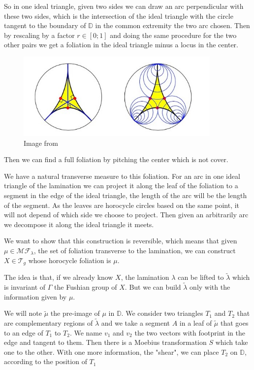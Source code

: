 So in one ideal triangle, given two sides we can draw an arc perpendicular with these two sides, which is the intersection of the ideal triangle with the circle tangent to the boundary of $\mathbb{D}$ in the common extremity the two arc chosen. Then by rescaling by a factor $r \in [0;1]$ and doing the same procedure for the two other pairs we get a foliation in the ideal triangle minus a locus in the center.


\begin{figure}[h!]
\centering
\includegraphics[width=10cm]{Image/FoliationTri.jpg}
\caption{Image from \cite{Martelli2016AnIT}}
\end{figure}

Then we can find a full foliation by pitching the center which is not cover.

We have a natural transverse measure to this foliation. For an arc in one ideal triangle of the lamination we can project it along the leaf of the foliation to a segment in the edge of the ideal triangle, the length of the arc will be the length of the segment. As the leaves are horocycle circles based on the same point, it will not depend of which side we choose to project. Then given an arbitrarily arc we decompose it along the ideal triangle it meets.

We want to show that this construction is reversible, which means that given $\mu \in \mathcal{MF}_\lambda $, the set of foliation transverse to the lamination, we can
construct $X \in \mathcal{T}_g$ whose horocycle foliation is $\mu$.

The idea is that, if we already know $X$, the lamination $\lambda$ can be lifted to $\tilde{\lambda}$ which is invariant of $\Gamma$ the Fushian group of $X$. But we can build $\tilde{\lambda}$ only with the information given by $\mu$.

We will note $\tilde{\mu}$ the pre-image of $\mu$ in $\mathbb{D}$. We consider two triangles $T_1$ and $T_2$ that are complementary regions of $\tilde{\lambda}$ and we take a segment $A$ in a leaf of $\tilde{\mu}$ that goes to an edge of $T_1$ to $T_2$. We name $v_1$ and $v_2$ the two vectors with footprint in the edge and tangent to them. Then there is a Moebius transformation $S$ which take one to the other. With one more information, the "shear", we can place $T_2$ on $\mathbb{D}$, according to the position of $T_1$

